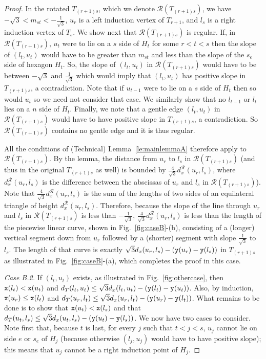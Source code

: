 \begin{proof}
In the rotated $T_{(r+1)s}$, which we denote $\mathcal{R}(T_{(r+1)s})$, 
we have $-\sqrt{3} < m_{st} < -\frac{1}{\sqrt{3}}$, $u_r$ is a left induction 
vertex of $T_{r+1}$, and $l_s$ is a right induction vertex of $T_s$. We show
next that $\mathcal{R}(T_{(r+1)s})$ is regular. If,
in $\mathcal{R}(T_{(r+1)s})$, $u_t$ were to lie on a $s$ side of $H_t$ for some
$r < t < s$ then the slope of $(l_t,u_t)$ would have to be greater than
$m_{st}$ and less than the slope of the $s_e$ side of hexagon $H_t$. So,
the slope of $(l_t,u_t)$ in $\mathcal{R}(T_{(r+1)s})$ would have to be
between $-\sqrt{3}$ and $\frac{1}{\sqrt{3}}$ which would imply that
$(l_t,u_t)$ has positive slope in $T_{(r+1)s}$, a contradiction. Note
that if $u_{t-1}$ were to lie on a $s$ side of $H_t$ then so would $u_t$ so
we need not consider that case. We similarly show that no $l_{t-1}$ or $l_t$
lies on a $n$ side of $H_t$. Finally, we note that a gentle edge
$(l_t, u_t)$ in $\mathcal{R}(T_{(r+1)s})$ would have to have positive slope in
$T_{(r+1)s}$, a contradiction. So $\mathcal{R}(T_{(r+1)s})$ contains no gentle
edge and it is thus regular.

All the conditions of (Technical) Lemma~\ref{le:mainlemmaA} therefore apply to
$\mathcal{R}(T_{(r+1)s})$. By the lemma, the distance from $u_r$ to $l_s$
in $\mathcal{R}(T_{(r+1)s})$ (and thus in the original $T_{(r+1)s}$ as well) is
bounded by 
$\frac{4}{\sqrt{3}} d^{\mathcal{R}}_x(u_r,l_s)$, where $d^{\mathcal{R}}_x(u_r,l_s)$
is the difference
between the abscissas of $u_r$ and $l_s$ in $\mathcal{R}(T_{(r+1)s})$). Note that
$\frac{4}{\sqrt{3}} d^{\mathcal{R}}_x(u_r,l_s)$ is the sum of the lengths of
two sides of an equilateral triangle of height $d^{\mathcal{R}}_x(u_r,l_s)$.
Therefore, because
the slope of the line through $u_r$ and $l_s$ in $\mathcal{R}(T_{(r+1)s})$ is
less than $-\frac{1}{\sqrt{3}}$, 
$\frac{4}{\sqrt{3}} d^{\mathcal{R}}_x(u_r,l_s)$ is less than the
length of the piecewise linear curve, shown in Fig.~\ref{fig:caseB}-(b),
consisting of a (longer) vertical segment down from $u_r$ followed by a
(shorter) segment with slope $\frac{1}{\sqrt{3}}$ to $l_s$. The length of that
curve is exactly $\sqrt{3}d_x(u_r,l_s)-({\tt y}(u_r)-{\tt y}(l_s))$ in
$T_{(r+1)s}$ as illustrated in Fig.~\ref{fig:caseB}-(a), which completes the
proof in this case.


{\em Case B.2.} If $(l_t,u_t)$ exists, as illustrated in
Fig.~\ref{fig:othercase}, then ${\tt x}(l_t) < {\tt x}(u_t)$ and 
$d_T(l_t,u_t) \leq \sqrt{3}d_x(l_t,u_t)-({\tt y}(l_t)-{\tt y}(u_t))$. Also,
by induction, ${\tt x}(u_r) \leq {\tt x}(l_t)$ and 
$d_T(u_r,l_t) \leq \sqrt{3}d_x(u_r,l_t)-({\tt y}(u_r)-{\tt y}(l_t))$.
What remains to be done is to show that ${\tt x}(u_t) < {\tt x}(l_s)$ and 
that $d_T(u_t,l_s) \leq \sqrt{3}d_x(u_t,l_s)-({\tt y}(u_t)-{\tt y}(l_s))$. 
We now have two cases to consider. Note first that, because $t$ is last, for 
every $j$ such that $t < j < s$, $u_j$ cannot lie on side $e$ or $s_e$ of $H_j$
(because otherwise $(l_j,u_j)$ would have to have positive slope); this means
that $u_j$ cannot be a right induction point of $H_j$.




\end{proof}

